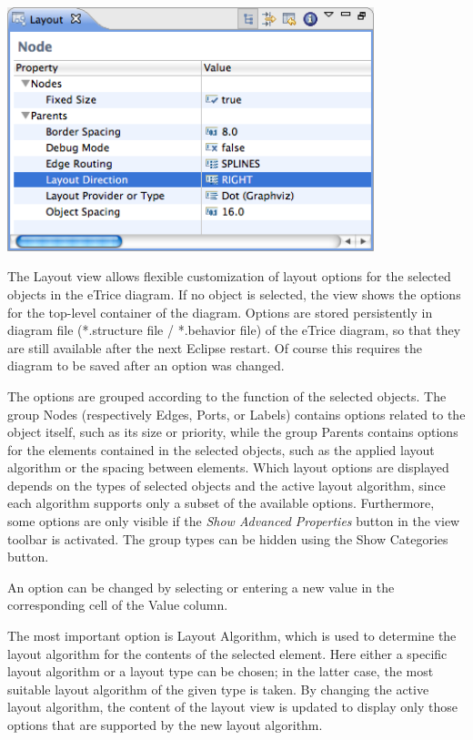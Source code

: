 \includegraphics[width=0.8\textwidth]{images/043-LayoutView.png}

The Layout view allows flexible customization of layout options for the selected objects in the eTrice 
diagram. If no object is selected, the view shows the options for the top-level container of the diagram. 
Options are stored persistently in diagram file (*.structure file / *.behavior file) of the eTrice 
diagram, so that they are still available after the next Eclipse restart. Of course this requires the 
diagram to be saved after an option was changed.

The options are grouped according to the function of the selected objects. The group Nodes (respectively 
Edges, Ports, or Labels) contains options related to the object itself, such as its size or priority, 
while the group Parents contains options for the elements contained in the selected objects, such as the 
applied layout algorithm or the spacing between elements. Which layout options are displayed depends on 
the types of selected objects and the active layout algorithm, since each algorithm supports only a subset 
of the available options. Furthermore, some options are only visible if the \textit{Show Advanced 
Properties} button in the view toolbar is activated. The group types can be hidden using the Show 
Categories button.

An option can be changed by selecting or entering a new value in the corresponding cell of the Value column.

The most important option is Layout Algorithm, which is used to determine the layout algorithm for the 
contents of the selected element. Here either a specific layout algorithm or a layout type can be chosen; 
in the latter case, the most suitable layout algorithm of the given type is taken. By changing the active 
layout algorithm, the content of the layout view is updated to display only those options that are 
supported by the new layout algorithm.

